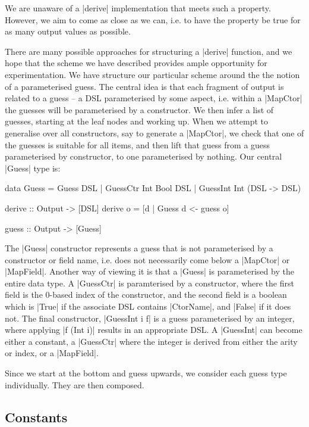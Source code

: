 \documentclass[preprint]{sigplanconf}
\begin{document}
We are unaware of a |derive| implementation that meets such a property. However, we aim to come as close as we can, i.e. to have the property be true for as many output values as possible.

There are many possible approaches for structuring a |derive| function, and we hope that the scheme we have described provides ample opportunity for experimentation. We have structure our particular scheme around the the notion of a parameterised guess. The central idea is that each fragment of output is related to a guess -- a DSL parameterised by some aspect, i.e. within a |MapCtor| the guesses will be parameterised by a constructor. We then infer a list of guesses, starting at the leaf nodes and working up. When we attempt to generalise over all constructors, say to generate a |MapCtor|, we check that one of the guesses is suitable for all items, and then lift that guess from a guess parameterised by constructor, to one parameterised by nothing. Our central |Guess| type is:

\begin{code}
data Guess  =  Guess DSL
            |  GuessCtr Int Bool DSL
            |  GuessInt Int (DSL -> DSL)

derive :: Output -> [DSL]
derive o = [d | Guess d <- guess o]

guess :: Output -> [Guess]
\end{code}

The |Guess| constructor represents a guess that is not parameterised by a constructor or field name, i.e. does not necessarily come below a |MapCtor| or |MapField|. Another way of viewing it is that a |Guess| is parameterised by the entire data type. A |GuessCtr| is paramterised by a constructor, where the first field is the 0-based index of the constructor, and the second field is a boolean which is |True| if the associate DSL contains |CtorName|, and |False| if it does not. The final constructor, |GuessInt i f| is a guess parameterised by an integer, where applying |f (Int i)| results in an appropriate DSL. A |GuessInt| can become either a constant, a |GuessCtr| where the integer is derived from either the arity or index, or a |MapField|.

Since we start at the bottom and guess upwards, we consider each guess type individually. They are then composed.

\subsection{Constants}
\end{document}
